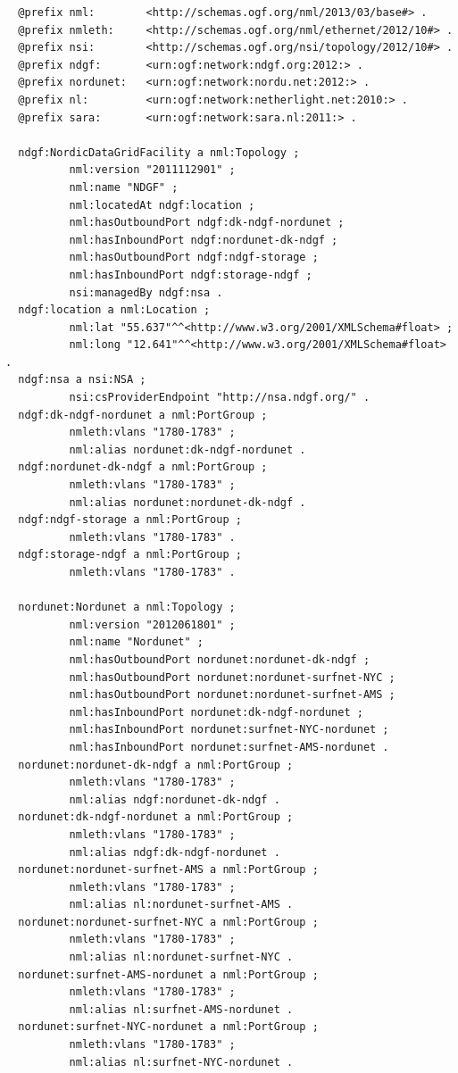 \documentclass[12pt]{article}  %
\begin{document}
\begin{verbatim}
  @prefix nml:        <http://schemas.ogf.org/nml/2013/03/base#> .
  @prefix nmleth:     <http://schemas.ogf.org/nml/ethernet/2012/10#> .
  @prefix nsi:        <http://schemas.ogf.org/nsi/topology/2012/10#> .
  @prefix ndgf:       <urn:ogf:network:ndgf.org:2012:> .
  @prefix nordunet:   <urn:ogf:network:nordu.net:2012:> .
  @prefix nl:         <urn:ogf:network:netherlight.net:2010:> .
  @prefix sara:       <urn:ogf:network:sara.nl:2011:> .

  ndgf:NordicDataGridFacility a nml:Topology ;
          nml:version "2011112901" ;
          nml:name "NDGF" ;
          nml:locatedAt ndgf:location ;
          nml:hasOutboundPort ndgf:dk-ndgf-nordunet ;
          nml:hasInboundPort ndgf:nordunet-dk-ndgf ;
          nml:hasOutboundPort ndgf:ndgf-storage ;
          nml:hasInboundPort ndgf:storage-ndgf ;
          nsi:managedBy ndgf:nsa .
  ndgf:location a nml:Location ;
          nml:lat "55.637"^^<http://www.w3.org/2001/XMLSchema#float> ;
          nml:long "12.641"^^<http://www.w3.org/2001/XMLSchema#float> .
  ndgf:nsa a nsi:NSA ;
          nsi:csProviderEndpoint "http://nsa.ndgf.org/" .
  ndgf:dk-ndgf-nordunet a nml:PortGroup ;
          nmleth:vlans "1780-1783" ;
          nml:alias nordunet:dk-ndgf-nordunet .
  ndgf:nordunet-dk-ndgf a nml:PortGroup ;
          nmleth:vlans "1780-1783" ;
          nml:alias nordunet:nordunet-dk-ndgf .
  ndgf:ndgf-storage a nml:PortGroup ;
          nmleth:vlans "1780-1783" .
  ndgf:storage-ndgf a nml:PortGroup ;
          nmleth:vlans "1780-1783" .

  nordunet:Nordunet a nml:Topology ;
          nml:version "2012061801" ;
          nml:name "Nordunet" ;
          nml:hasOutboundPort nordunet:nordunet-dk-ndgf ;
          nml:hasOutboundPort nordunet:nordunet-surfnet-NYC ;
          nml:hasOutboundPort nordunet:nordunet-surfnet-AMS ;
          nml:hasInboundPort nordunet:dk-ndgf-nordunet ;
          nml:hasInboundPort nordunet:surfnet-NYC-nordunet ;
          nml:hasInboundPort nordunet:surfnet-AMS-nordunet .
  nordunet:nordunet-dk-ndgf a nml:PortGroup ;
          nmleth:vlans "1780-1783" ;
          nml:alias ndgf:nordunet-dk-ndgf .
  nordunet:dk-ndgf-nordunet a nml:PortGroup ;
          nmleth:vlans "1780-1783" ;
          nml:alias ndgf:dk-ndgf-nordunet .
  nordunet:nordunet-surfnet-AMS a nml:PortGroup ;
          nmleth:vlans "1780-1783" ;
          nml:alias nl:nordunet-surfnet-AMS .
  nordunet:nordunet-surfnet-NYC a nml:PortGroup ;
          nmleth:vlans "1780-1783" ;
          nml:alias nl:nordunet-surfnet-NYC .
  nordunet:surfnet-AMS-nordunet a nml:PortGroup ;
          nmleth:vlans "1780-1783" ;
          nml:alias nl:surfnet-AMS-nordunet .
  nordunet:surfnet-NYC-nordunet a nml:PortGroup ;
          nmleth:vlans "1780-1783" ;
          nml:alias nl:surfnet-NYC-nordunet .


\end{verbatim}
\end{document}
